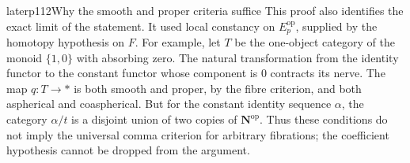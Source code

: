 \begin{dcomment}{later}{p112}{Why the smooth and proper criteria suffice}
This proof also identifies the exact limit of the statement. It used local constancy on $E_p^{\mathrm{op}}$, supplied by the homotopy hypothesis on $F$. For example, let $T$ be the one-object category of the monoid $\{1,0\}$ with absorbing zero. The natural transformation from the identity functor to the constant functor whose component is $0$ contracts its nerve. The map $q:T\to *$ is both smooth and proper, by the fibre criterion, and both aspherical and coaspherical. But for the constant identity sequence $\alpha$, the category $\alpha/t$ is a disjoint union of two copies of $\mathbf N^{\mathrm{op}}$. Thus these conditions do not imply the universal comma criterion for arbitrary fibrations; the coefficient hypothesis cannot be dropped from the argument.
\end{dcomment}


